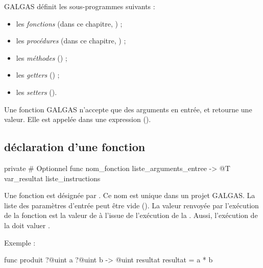 

GALGAS définit les sous-programmes suivants :
\begin{itemize}
  \item les \emph{fonctions} (dans ce chapitre, ) ;
  \item les \emph{procédures} (dans ce chapitre, ) ;
  \item les \emph{méthodes} () ;
  \item les \emph{getters} () ;
  \item les \emph{setters} ().
\end{itemize}


Une fonction GALGAS n'accepte que des arguments en entrée, et retourne une valeur. Elle est appelée dans une expression ().

\subsection{déclaration d'une fonction}

\begin{galgascode}
private # Optionnel
func nom_fonction liste_arguments_entree -> @T var_resultat {
  liste_instructions
}
\end{galgascode}

Une fonction est désignée par . Ce nom est unique dans un projet GALGAS. La liste des paramètres d'entrée peut être vide (). La valeur renvoyée par l'exécution de la fonction est la valeur de  à l'issue de l'exécution de la . Aussi, l'exécution de la  doit valuer .

Exemple :

\begin{galgascode}
func produit ?@uint a ?@uint b -> @uint resultat {
  resultat = a * b
}
\end{galgascode}



